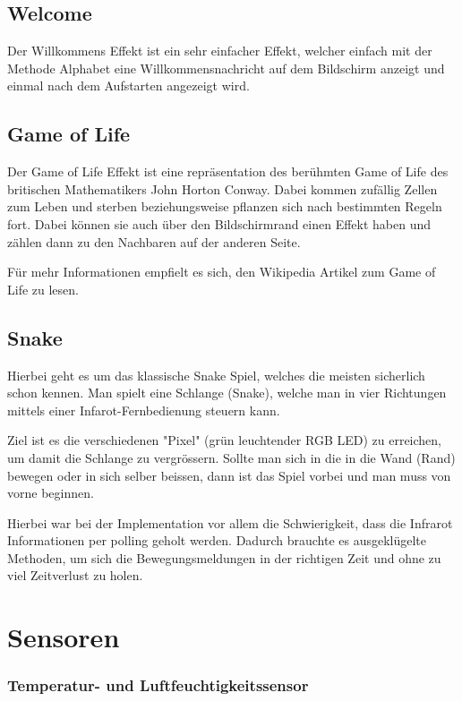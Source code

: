 \documentclass[12pt,a4paper]{article}
\begin{document}
\subsection{Welcome}

Der Willkommens Effekt ist ein sehr einfacher Effekt, welcher einfach mit der Methode Alphabet eine Willkommensnachricht auf dem Bildschirm anzeigt und einmal nach dem Aufstarten angezeigt wird.

\subsection{Game of Life}

Der Game of Life Effekt ist eine repräsentation des berühmten Game of Life des britischen Mathematikers John Horton Conway. Dabei kommen  zufällig Zellen zum Leben und sterben beziehungsweise pflanzen sich nach bestimmten Regeln fort. Dabei können sie auch über den Bildschirmrand einen Effekt haben und zählen dann zu den Nachbaren auf der anderen Seite. 

Für mehr Informationen empfielt es sich, den Wikipedia Artikel zum Game of Life zu lesen\cite{GOL}.
\newpage
\subsection{Snake}

Hierbei geht es um das klassische Snake Spiel, welches die meisten sicherlich schon kennen\cite{snake}.
Man spielt eine Schlange (Snake), welche man in vier Richtungen mittels einer Infarot-Fernbedienung steuern kann.

Ziel ist es die verschiedenen "Pixel" (grün leuchtender RGB LED) zu erreichen, um damit die Schlange zu vergrössern. Sollte man sich in die in die Wand (Rand) bewegen oder in sich selber beissen, dann ist das Spiel vorbei und man muss von vorne beginnen.

Hierbei war bei der Implementation vor allem die Schwierigkeit, dass die Infrarot Informationen per polling geholt werden. Dadurch brauchte es ausgeklügelte Methoden, um sich die Bewegungsmeldungen in der richtigen Zeit und ohne zu viel Zeitverlust zu holen.

\section{Sensoren}

\subsubsection{Temperatur- und Luftfeuchtigkeitssensor}
\end{document}
